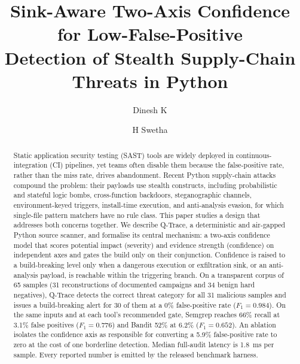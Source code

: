 \documentclass[runningheads]{llncs}
\newcommand{\pct}{\%}
\begin{document}
\title{Sink-Aware Two-Axis Confidence for Low-False-Positive\\
Detection of Stealth Supply-Chain Threats in Python}

\author{Dinesh K \and H Swetha}

\maketitle

\begin{abstract}
Static application security testing (SAST) tools are widely deployed in
continuous-integration (CI) pipelines, yet teams often disable them because the
false-positive rate, rather than the miss rate, drives abandonment. Recent
Python supply-chain attacks compound the problem: their payloads use stealth
constructs, including probabilistic and stateful logic bombs, cross-function
backdoors, steganographic channels, environment-keyed triggers, install-time
execution, and anti-analysis evasion, for which single-file pattern matchers
have no rule class. This paper studies a design that addresses both concerns
together. We describe Q-Trace, a deterministic and air-gapped Python source
scanner, and formalise its central mechanism: a two-axis confidence model that
scores potential impact (severity) and evidence strength (confidence) on
independent axes and gates the build only on their conjunction. Confidence is
raised to a build-breaking level only when a dangerous execution or exfiltration
sink, or an anti-analysis payload, is reachable within the triggering branch. On
a transparent corpus of 65 samples (31 reconstructions of documented campaigns
and 34 benign hard negatives), Q-Trace detects the correct threat category for
all 31 malicious samples and issues a build-breaking alert for 30 of them at a
0\pct{} false-positive rate ($F_1 = 0.984$). On the same inputs and at each
tool's recommended gate, Semgrep reaches 66\pct{} recall at 3.1\pct{} false
positives ($F_1 = 0.776$) and Bandit 52\pct{} at 6.2\pct{} ($F_1 = 0.652$). An
ablation isolates the confidence axis as responsible for converting a 5.9\pct{}
false-positive rate to zero at the cost of one borderline detection. Median
full-audit latency is 1.8~ms per sample. Every reported number is emitted by the
released benchmark harness.

\end{abstract}
\end{document}
